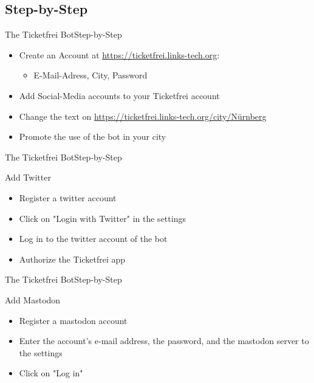 \documentclass[10pt]{beamer}
\begin{document}
{\subsection{Step-by-Step}
\begin{frame}{The Ticketfrei Bot}{Step-by-Step}

\begin{itemize}
	\item Create an Account at \url{https://ticketfrei.links-tech.org}:
  \begin{itemize}
    \item E-Mail-Adress, City, Password
  \end{itemize}
  \item Add Social-Media accounts to your Ticketfrei account
  \item Change the text on \url{https://ticketfrei.links-tech.org/city/Nürnberg}
  \item Promote the use of the bot in your city
\end{itemize}

\end{frame}
\begin{frame}{The Ticketfrei Bot}{Step-by-Step}

\begin{block}{{Add Twitter}}
  \begin{itemize}
    \item Register a twitter account
    \item Click on "Login with Twitter" in the settings
    \item Log in to the twitter account of the bot
    \item Authorize the Ticketfrei app
  \end{itemize}
\end{block}

\end{frame}
\begin{frame}{The Ticketfrei Bot}{Step-by-Step}

\begin{block}{{Add Mastodon}}
  \begin{itemize}
    \item Register a mastodon account
    \item Enter the account's e-mail address, the password, and the mastodon server to the settings
    \item Click on "Log in"
  \end{itemize}
\end{block}


\end{frame}}
\end{document}

